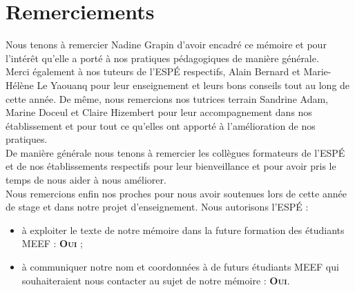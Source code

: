 \section*{Remerciements}
Nous tenons à remercier Nadine Grapin d'avoir encadré ce mémoire et pour l'intérêt qu'elle a porté à nos pratiques pédagogiques de manière générale.\\
Merci également à nos tuteurs de l'ESPÉ respectifs, Alain Bernard et Marie-Hélène Le Yaouanq pour leur enseignement et leurs bons conseils tout au long de cette année. De même, nous remercions nos tutrices terrain Sandrine Adam, Marine Doceul et Claire Hizembert pour leur accompagnement dans nos établissement et pour tout ce qu'elles ont apporté à l'amélioration de nos pratiques.\\
De manière générale nous tenons à remercier les collègues formateurs de l'ESPÉ et de nos établissements respectifs pour leur bienveillance et pour avoir pris le temps de nous aider à nous améliorer.\\
Nous remercions enfin nos proches pour nous avoir soutenues lors de cette année de stage et dans notre projet d'enseignement.
\vfill
Nous autorisons l'ESPÉ :
\begin{itemize}
\item à exploiter le texte de notre mémoire dans la future formation des étudiants MEEF : \textbf{\textsc{Oui}} ;
\item à communiquer notre nom et coordonnées à de futurs étudiants MEEF qui souhaiteraient nous contacter au sujet de notre mémoire : \textbf{\textsc{Oui}}.
\end{itemize}
